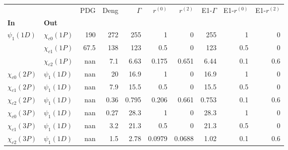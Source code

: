 \begin{tabular}{l|l|r|r|r|r|r|r|r|r}
\toprule
                &                &  PDG &  Deng &  $\Gamma$ &  $r^{(0)}$ &  $r^{(2)}$ &  E1-$\Gamma$ &  E1-$r^{(0)}$ &  E1-$r^{(2)}$ \\
\textbf{In} & \textbf{Out} &      &       &           &            &            &              &               &               \\
\midrule
\textbf{$\psi_{1}(1D)$} & \textbf{$\chi_{c0}(1P)$} &  190 &   272 &       255 &          1 &          0 &          255 &             1 &             0 \\
                & \textbf{$\chi_{c1}(1P)$} & 67.5 &   138 &       123 &        0.5 &          0 &          123 &           0.5 &             0 \\
                & \textbf{$\chi_{c2}(1P)$} &  nan &   7.1 &      6.63 &      0.175 &      0.651 &         6.44 &           0.1 &           0.6 \\
\textbf{$\chi_{c0}(2P)$} & \textbf{$\psi_{1}(1D)$} &  nan &    20 &      16.9 &          1 &          0 &         16.9 &             1 &             0 \\
\textbf{$\chi_{c1}(2P)$} & \textbf{$\psi_{1}(1D)$} &  nan &   7.9 &      15.5 &        0.5 &          0 &         15.5 &           0.5 &             0 \\
\textbf{$\chi_{c2}(2P)$} & \textbf{$\psi_{1}(1D)$} &  nan &  0.36 &     0.795 &      0.206 &      0.661 &        0.753 &           0.1 &           0.6 \\
\textbf{$\chi_{c0}(3P)$} & \textbf{$\psi_{1}(1D)$} &  nan &  0.27 &      28.3 &          1 &          0 &         28.3 &             1 &             0 \\
\textbf{$\chi_{c1}(3P)$} & \textbf{$\psi_{1}(1D)$} &  nan &   3.2 &      21.3 &        0.5 &          0 &         21.3 &           0.5 &             0 \\
\textbf{$\chi_{c2}(3P)$} & \textbf{$\psi_{1}(1D)$} &  nan &   1.5 &      2.78 &     0.0979 &     0.0688 &         1.02 &           0.1 &           0.6 \\
\bottomrule
\end{tabular}
